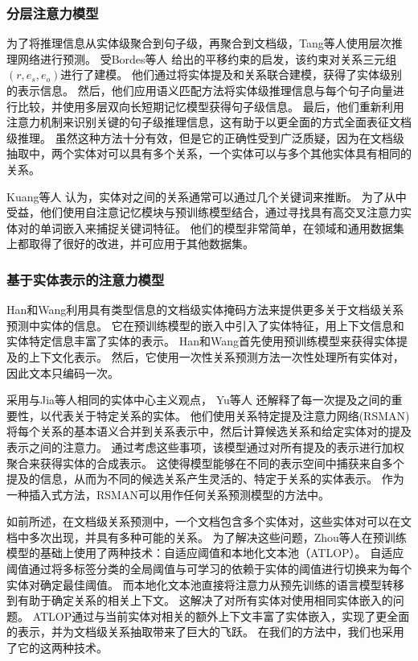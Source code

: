 \documentclass[bachelor]{thesis-uestc}
\begin{document}
\subsubsection{分层注意力模型}
为了将推理信息从实体级聚合到句子级，再聚合到文档级，Tang等人使用层次推理网络进行预测。
受Bordes等人 给出的平移约束的启发，该约束对关系三元组$( r, e_s, e_o )$进行了建模。
他们通过将实体提及和关系联合建模，获得了实体级别的表示信息。
然后，他们应用语义匹配方法将实体级推理信息与每个句子向量进行比较，并使用多层双向长短期记忆模型获得句子级信息。
最后，他们重新利用注意力机制来识别关键的句子级推理信息，这有助于以更全面的方式全面表征文档级推理。
虽然这种方法十分有效，但是它的正确性受到广泛质疑，因为在文档级抽取中，两个实体对可以具有多个关系，一个实体可以与多个其他实体具有相同的关系。\par

Kuang等人 认为，实体对之间的关系通常可以通过几个关键词来推断。
为了从中受益，他们使用自注意记忆模块与预训练模型结合，通过寻找具有高交叉注意力实体对的单词嵌入来捕捉关键词特征。
他们的模型非常简单，在领域和通用数据集上都取得了很好的改进，并可应用于其他数据集。

\subsubsection{基于实体表示的注意力模型}\label{subsec:entity-based-attention}

Han和Wang利用具有类型信息的文档级实体掩码方法来提供更多关于文档级关系预测中实体的信息。
它在预训练模型的嵌入中引入了实体特征，用上下文信息和实体特定信息丰富了实体的表示。
Han和Wang首先使用预训练模型来获得实体提及的上下文化表示。
然后，它使用一次性关系预测方法一次性处理所有实体对，因此文本只编码一次。\par

采用与Jia等人相同的实体中心主义观点， Yu等人 还解释了每一次提及之间的重要性，以代表关于特定关系的实体。
他们使用关系特定提及注意力网络(RSMAN)将每个关系的基本语义合并到关系表示中，然后计算候选关系和给定实体对的提及表示之间的注意力。
通过考虑这些事项，该模型通过对所有提及的表示进行加权聚合来获得实体的合成表示。
这使得模型能够在不同的表示空间中捕获来自多个提及的信息，从而为不同的候选关系产生灵活的、特定于关系的实体表示。
作为一种插入式方法，RSMAN可以用作任何关系预测模型的方法中。\par

如前所述，在文档级关系预测中，一个文档包含多个实体对，这些实体对可以在文档中多次出现，并具有多种可能的关系。
为了解决这些问题，Zhou等人在预训练模型的基础上使用了两种技术：自适应阈值和本地化文本池（ATLOP）。
自适应阈值通过将多标签分类的全局阈值与可学习的依赖于实体的阈值进行切换来为每个实体对确定最佳阈值。
而本地化文本池直接将注意力从预先训练的语言模型转移到有助于确定关系的相关上下文。
这解决了对所有实体对使用相同实体嵌入的问题。
ATLOP通过与当前实体对相关的额外上下文丰富了实体嵌入，实现了更全面的表示，并为文档级关系抽取带来了巨大的飞跃。
在我们的方法中，我们也采用了它的这两种技术。\par
\end{document}
